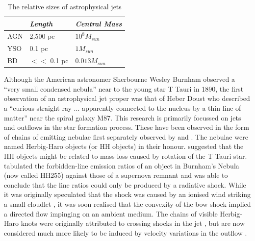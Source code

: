 \begin{table}
\begin{tabular}{|p{3.5cm}|p{4.5cm}|p{4.5cm}|}
\hline
& \emph{Length} & \emph{Central Mass} \\
\hline
AGN & 2,500 pc & $10^8 M_{sun}$ \\
\hline
YSO & 0.1 pc & $1 M_{sun}$ \\
\hline
BD & $<<$ 0.1 pc & $ 0.013 M_{sun}$ \\
\hline
\end{tabular}
\caption{The relative sizes of astrophysical jets}
\label{tab:jets}
\end{table}


Although the American astronomer Sherbourne Wesley Burnham observed a ``very small condensed nebula'' near to the young star T Tauri in 1890, 
the first observation of an astrophysical jet proper was that of
Heber Doust \citet{1918PLicO..13...55C} who described a ``curious straight ray ... apparently
connected to the nucleus by a thin line of matter'' near the spiral galaxy M87. 
This research is primarily focussed on jets and outflows in the star formation process.
These have been observed in the form of chains of emitting nebulae first separately observed by
\citet{1951ApJ...113..697H} and \citet{1952ApJ...115..572H}.
The nebulae were named Herbig-Haro objects (or HH objects) in their honour.  
\citet{1958PASP...70..399O} suggested that the HH objects might be related to
mass-loss caused by rotation of the T Tauri star. 
\citet{1975ApJ...195..631S} tabulated the forbidden-line emission ratios of an
object in Burnham's Nebula (now called HH255) against those of a supernova remnant and was able to conclude that the
line ratios could only be produced by a radiative shock. While it was originally
speculated that the shock was caused by an ionised wind striking a small
cloudlet \citep{1978ApJ...223..884S},
it was soon realised that the convexity of the bow shock implied a directed flow
impinging on an ambient medium. The chains of visible Herbig-Haro knots were
originally attributed to crossing shocks in the jet \citep{1987MNRAS.225..741F}, but are now considered much
more likely to be induced by velocity variations in the outflow \citep{2001A&A...367..959R}.


